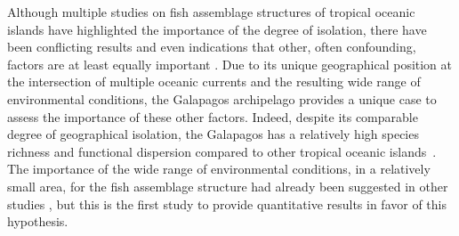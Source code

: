 \documentclass[jmse,article,accept,moreauthors,pdftex]{Definitions/mdpi}
\begin{document}
\begin{paracol}{2}
Although multiple studies on fish assemblage structures of tropical oceanic islands have highlighted the importance of the degree of isolation, there have been conflicting results and even indications that other, often confounding, factors are at least equally important \citep{Hobbs2011ExtinctionFishes,Luiz2015CommunityVariables,Quimbayo2019DeterminantsIslands}. Due to its unique geographical position at the intersection of multiple oceanic currents and the resulting wide range of environmental conditions, the Galapagos archipelago provides a unique case to assess the importance of these other factors. Indeed, despite its comparable degree of geographical isolation, the Galapagos has a relatively high species richness and functional dispersion compared to other tropical oceanic \mbox{islands \citep{Giddens2019PatternsPacific,Quimbayo2019DeterminantsIslands}.} The importance of the wide range of environmental conditions, in a relatively small area, for the fish assemblage structure had already been suggested in other studies \citep{Edgar2004,Stuart-Smith2013IntegratingDiversity}, but this is the first study to provide quantitative results in favor of this hypothesis. 






\end{paracol}
\end{document}
